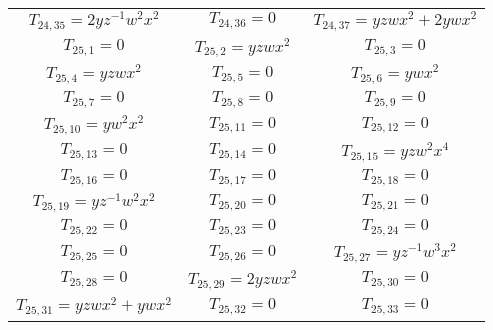 \documentclass[12pt]{memoireuqam1.3}
\begin{document}
\begin{longtable}{|c|c|c|}
$T_{24,35}= 2yz^{-1}w^2x^2$&

$T_{24,36}= 0$&

$T_{24,37}= yzwx^2+2ywx^2$\\

$T_{25,1}= 0$&

$T_{25,2}= yzwx^2$&

$T_{25,3}= 0$\\

$T_{25,4}= yzwx^2$&

$T_{25,5}= 0$&

$T_{25,6}= ywx^2$\\

$T_{25,7}= 0$&

$T_{25,8}= 0$&

$T_{25,9}= 0$\\

$T_{25,10}= yw^2x^2$&

$T_{25,11}= 0$&

$T_{25,12}= 0$\\

$T_{25,13}= 0$&

$T_{25,14}= 0$&

$T_{25,15}= yzw^2x^4$\\

$T_{25,16}= 0$&

$T_{25,17}= 0$&

$T_{25,18}= 0$\\

$T_{25,19}= yz^{-1}w^2x^2$&

$T_{25,20}= 0$&

$T_{25,21}= 0$\\

$T_{25,22}= 0$&

$T_{25,23}= 0$&

$T_{25,24}= 0$\\

$T_{25,25}= 0$&

$T_{25,26}= 0$&

$T_{25,27}= yz^{-1}w^3x^2$\\

$T_{25,28}= 0$&

$T_{25,29}= 2yzwx^2$&

$T_{25,30}= 0$\\

$T_{25,31}= yzwx^2+ywx^2$&

$T_{25,32}= 0$&

$T_{25,33}= 0$\\


\end{longtable}
\end{document}
